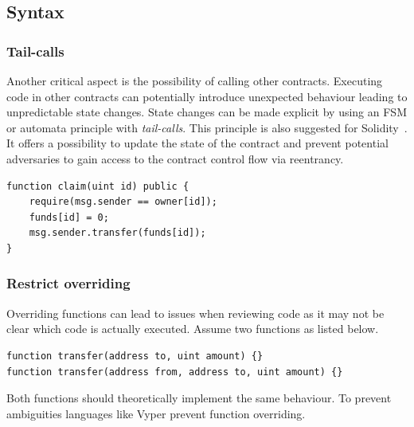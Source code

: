 \subsection{Syntax}
\subsubsection{Tail-calls}
Another critical aspect is the possibility of calling other contracts. Executing code in other contracts can potentially introduce unexpected behaviour leading to unpredictable state changes. State changes can be made explicit by using an FSM or automata principle with \emph{tail-calls}. This principle is also suggested for Solidity~\cite{ConsenSys2018Security}.
It offers a possibility to update the state of the contract and prevent potential adversaries to gain access to the contract control flow via reentrancy.

\begin{lstlisting}[caption={Tail calls implemented in Solidity.},label=lst:tail-call,language=Solidity]
function claim(uint id) public {
    require(msg.sender == owner[id]);
    funds[id] = 0;
    msg.sender.transfer(funds[id]);
}
\end{lstlisting}



\subsubsection{Restrict overriding}
Overriding functions can lead to issues when reviewing code as it may not be clear which code is actually executed. Assume two functions as listed below.
\begin{lstlisting}[caption={Function overriding with different inputs.},label=lst:tail-call,language=Solidity]
function transfer(address to, uint amount) {}
function transfer(address from, address to, uint amount) {}
\end{lstlisting}
Both functions should theoretically implement the same behaviour. To prevent ambiguities languages like Vyper prevent function overriding.


